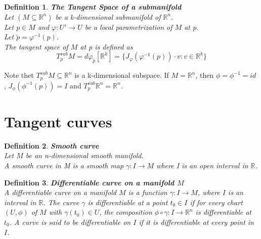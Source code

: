 \documentclass[11pt]{book} %
\newtheorem{definition}{Definition}[section]
\begin{document}
\begin{definition}{\textbf{The Tangent Space of a submanifold}} \\
    Let \( (M \subseteq \mathbb{R}^n) \) be a k-dimensional submanifold of \( \mathbb{R}^n \). \\
    Let \( p \in M \) and \( \varphi : U' \to U \) be a local parametrization of \( M \) at p. \\
    Let \( \tilde{p} = \varphi^{-1}(p) \). \\
    The tangent space of \( M \) at p is defined as 
    \begin{equation*}
        T_p^{sub} M = d\varphi_{\tilde{p}}[\mathbb{R}^k] = \{ J_{\varphi}(\varphi^{-1}(p)) \cdot v : v \in \mathbb{R}^k \}
    \end{equation*}
\end{definition}

Note thet \( T_p^{sub} M \subseteq \mathbb{R}^n \) is a k-dimensional subspace.
If \( M = \mathbb{R}^n \), then $\phi = \phi^{-1}=id$ , $J_{\phi}(\phi^{-1}(p)) = I$ and $T_p^{sub} \mathbb{R}^n = \mathbb{R}^n$.



\section{Tangent curves}

\begin{definition}{\textbf{Smooth curve}} \\
    Let \( M \) be an n-dimensional smooth manifold. \\
    A smooth curve in M is a smooth map \( \gamma: I \to M \) where I is an open interval in \( \mathbb{R} \).
\end{definition}


\begin{definition}{\textbf{Differentiable curve on a manifold \( M \)}} \\
    A differentiable curve on a manifold \( M \) is a function \( \gamma: I \to M \), where \( I \) is an interval in \( \mathbb{R} \). 
    The curve \( \gamma \) is differentiable at a point \( t_0 \in I \) if for every chart 
    \( (U, \phi) \) of \( M \) with \( \gamma(t_0) \in U \), the composition \( \phi \circ \gamma: I \to \mathbb{R}^n \) is differentiable at \( t_0 \). 
    A curve is said to be differentiable on \( I \) if it is differentiable at every point in \( I \).
\end{definition}
\end{document}
